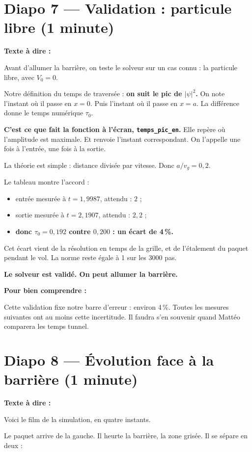 \documentclass[12pt,a4paper]{article}
\newcommand{\diapo}[2]{\section*{Diapo #1 --- #2}}
\newenvironment{comprendre}%
{\par\medskip\noindent\hrulefill\par\nopagebreak\textbf{Pour bien comprendre :}\par}%
{\par\nopagebreak\noindent\hrulefill\par\medskip}
\begin{document}
	\clearpage
	\diapo{7}{Validation : particule libre (1 minute)}
	
	\textbf{Texte à dire :}
	
	Avant d'allumer la barrière, on teste le solveur sur un cas connu :
	la particule libre, avec $V_0 = 0$.
	
	Notre définition du temps de traversée :
	\textbf{on suit le pic de $|\psi|^2$.}
	On note l'instant où il passe en $x = 0$.
	Puis l'instant où il passe en $x = a$.
	La différence donne le temps numérique $\tau_0$.
	
	\textbf{C'est ce que fait la fonction à l'écran, \texttt{temps\_pic\_en}.}
	Elle repère où l'amplitude est maximale.
	Et renvoie l'instant correspondant.
	On l'appelle une fois à l'entrée, une fois à la sortie.
	
	La théorie est simple : distance divisée par vitesse.
	Donc $a / v_g = 0{,}2$.
	
	Le tableau montre l'accord :
	
	\begin{itemize}
		\item entrée mesurée à $t = 1{,}9987$, attendu : $2$ ;
		\item sortie mesurée à $t = 2{,}1907$, attendu : $2{,}2$ ;
		\item \textbf{donc $\tau_0 = 0{,}192$ contre $0{,}200$ : un écart de 4\,\%.}
	\end{itemize}
	
	Cet écart vient de la résolution en temps de la grille,
	et de l'étalement du paquet pendant le vol.
	La norme reste égale à 1 sur les 3000 pas.
	
	\textbf{Le solveur est validé. On peut allumer la barrière.}
	
	\begin{comprendre}
		Cette validation fixe notre barre d'erreur : environ 4\,\%.
		Toutes les mesures suivantes ont au moins cette incertitude.
		Il faudra s'en souvenir quand Mattéo comparera les temps tunnel.
	\end{comprendre}
	
	\clearpage
	\diapo{8}{Évolution face à la barrière (1 minute)}
	
	\textbf{Texte à dire :}
	
	Voici le film de la simulation, en quatre instants.
	
	Le paquet arrive de la gauche.
	Il heurte la barrière, la zone grisée.
	Il se sépare en deux :
	
\end{document}
